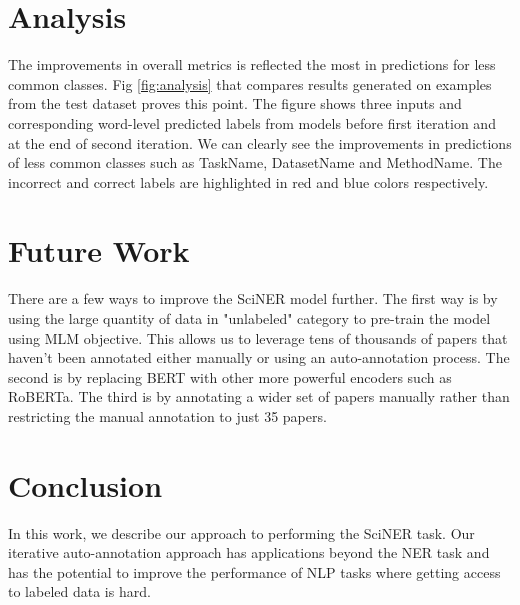 \documentclass[11pt]{article}
\begin{document}
\section{Analysis}\label{sec:analysis}
The improvements in overall metrics is reflected the most in predictions for less common classes. Fig \ref{fig:analysis} that compares results generated on examples from the test dataset proves this point. The figure shows three inputs and corresponding word-level predicted labels from models before first iteration and at the end of second iteration. We can clearly see the improvements in predictions of less common classes such as TaskName, DatasetName and MethodName. The incorrect and correct labels are highlighted in red and blue colors respectively.

\section{Future Work}
There are a few ways to improve the SciNER model further. The first way is by using the large quantity of data in "unlabeled" category to pre-train the model using MLM objective. This allows us to leverage tens of thousands of papers that haven't been annotated either manually or using an auto-annotation process. The second is by replacing BERT with other more powerful encoders such as RoBERTa. The third is by annotating a wider set of papers manually rather than restricting the manual annotation to just 35 papers.
\section{Conclusion}\label{sec:conclusion}
In this work, we describe our approach to performing the SciNER task. Our iterative auto-annotation approach has applications beyond the NER task and has the potential to improve the performance of NLP tasks where getting access to labeled data is hard. 


\end{document}
